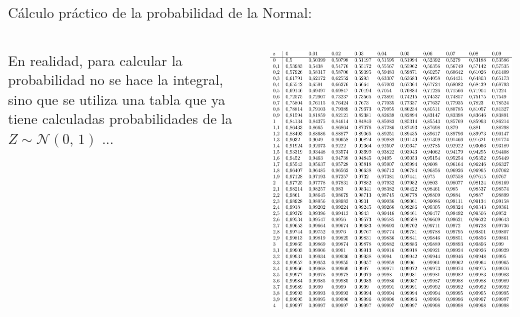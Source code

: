 \documentclass[11pt,handout]{beamer}
\begin{document}
\begin{frame}{Cálculo práctico de la probabilidad de la Normal:}
\begin{columns}
\begin{column}{0.4\textwidth}
\begin{block}{}
En realidad, para calcular la probabilidad no se hace la integral, sino que se utiliza una tabla que ya tiene calculadas probabilidades de la  $Z \sim \mathcal{N}(0,\,1)
    $ ...
\end{block}
\end{column}
\begin{column}{0.6\textwidth}
\includegraphics[page=1,width=1\textwidth]{probabilidad/distribucion_normal}
\end{column}
\end{columns}


\end{frame}
\end{document}
